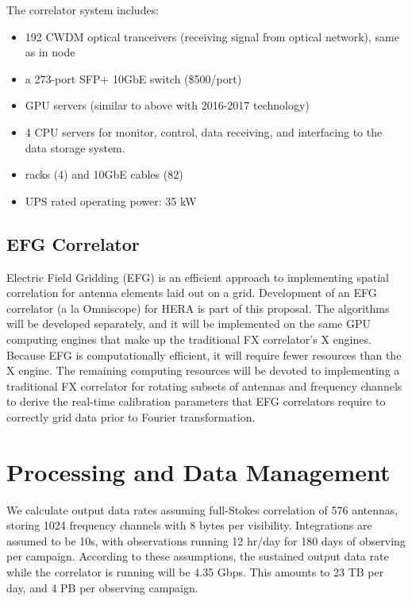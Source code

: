 \documentclass[11pt]{article}
\begin{document}
The correlator system includes:
\begin{itemize}
\item 192 CWDM optical tranceivers (receiving signal from optical network), same as in node
\item a 273-port SFP+ 10GbE switch (\$500/port)
\item GPU servers (similar to above with 2016-2017 technology)
\item 4 CPU servers for monitor, control, data receiving, and interfacing to the data storage system.
\item racks (4) and 10GbE cables (82)
\item UPS rated operating power: 35 kW
\end{itemize}

\subsection{EFG Correlator}
Electric Field Gridding (EFG) is an efficient approach to implementing spatial correlation for
antenna elements laid out on a grid.  Development of an EFG correlator (a la Omniscope) for HERA
is part of this proposal.  The algorithms will be developed separately, and it will be implemented 
on the same GPU computing engines that make up the traditional FX correlator's X engines.  Because
EFG is computationally efficient, it will require fewer resources than the X engine.  The remaining 
computing resources will be devoted to implementing a traditional FX correlator for rotating subsets
of antennas and frequency channels to derive the real-time calibration parameters that EFG correlators
require to correctly grid data prior to Fourier transformation.

\section{Processing and Data Management}
\label{sec:procData}
We calculate output data rates assuming full-Stokes correlation of 576 antennas, storing 1024 frequency
channels with 8 bytes per visibility.  Integrations are assumed to be 10s, with observations running
12 hr/day for 180 days of observing per campaign.  According to these assumptions, 
the sustained output data rate while the 
correlator is running will be 4.35 Gbps.  This amounts to 23 TB per day, and 4 PB per observing campaign.
\end{document}
